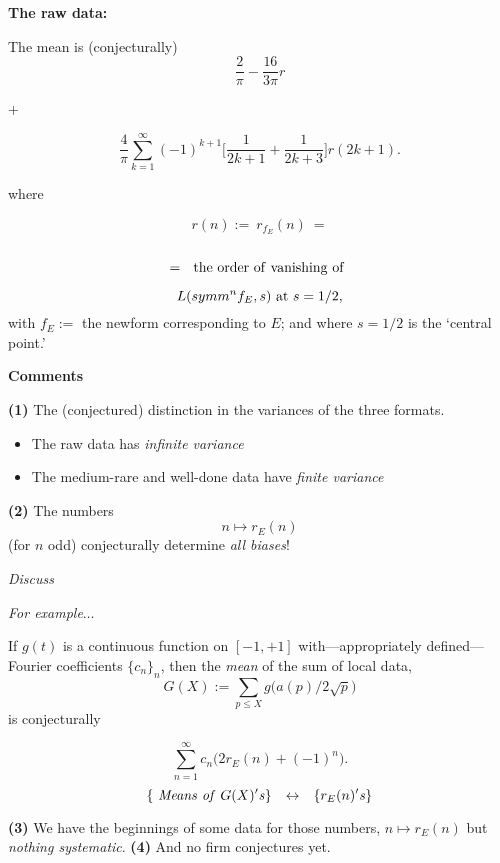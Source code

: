 \documentclass[12pt]{beamer}
\theoremstyle{definition}
\begin{document}
 \begin{frame}\vskip20pt
{\Large  \vskip20pt 
    
      \centerline{\bf The raw data:}\vskip5pt  The  mean is  (conjecturally) $$
{\frac{2}{\pi}}- {\frac{16}{3\pi}}r$$ \vskip5pt \centerline{ + }  \vskip5pt $$ {\frac{4}{\pi}} \sum_{k=1}^{\infty}  (-1)^{k+1}\big[{\frac{1}{2k+1}} + {\frac{1}{2k+3}}\big]r({2k+1}).
$$ \centerline{  where }  } \end{frame}
  
 \begin{frame}\vskip20pt
{\Large  \vskip20pt $$r(n):= \ r_{f_E}(n)\ =$$ \\
$$=\ \  {\rm the\ order\ of\ vanishing\ of\ }$$

$$L(symm^nf_E, s)\ {\rm at}\ s=1/2,$$ \vskip20pt with $f_E:=$ the newform  corresponding to  $E$; and where  $s=1/2$ is the `central point.'  } 
\end{frame}
  
 \begin{frame}
{\Large  \vskip20pt  \centerline{ \bf Comments}
\vskip20pt {\bf(1)}  The (conjectured) distinction in the variances of the three formats.\vskip20pt
  \begin{itemize} \item   The raw data has {\it infinite variance} \item The medium-rare and well-done data have {\it finite variance}\end{itemize}} \end{frame}
 \begin{frame}
{\Large  \vskip20pt   {\bf(2)} The numbers \vskip20pt $$n \mapsto r_E(n)$$ \vskip20pt (for $n$ odd) conjecturally determine {\it all biases}!} \vskip20pt \centerline{\it Discuss}\end{frame}
 \begin{frame}\vskip20pt  
{\Large  \vskip20pt  \centerline{\it For example$\dots$}  \vskip20pt   If    $g(t)$ is a continuous function on $[-1,+1]$  with---appropriately defined---Fourier coefficients $\{c_n\}_n$, then the {\it mean} of the sum of local data,  $$G(X):= \sum_{p\le X}g\big(a(p)/2{\sqrt p}\big)$$  is conjecturally}\end{frame}
 \begin{frame}\vskip20pt  
{\Large  \vskip20pt    $$\sum_{n=1}^{\infty}  c_n\big(2r_E(n)+(-1)^n\big).$$\vskip20pt  
$$\{ {\rm{\it  \  Means\ of\ }} G(X){\rm{\it 's}}\} \ \ \  {\leftrightarrow}\ \ \  \{r_E(n){\rm{\it 's}}\}$$}\end{frame}
 \begin{frame}\vskip20pt
{\Large  \vskip20pt
  {\bf(3)} We have the beginnings of some data for those numbers, $n \mapsto r_E(n)$
 \vskip20pt
 but {\it nothing systematic}.  \vskip20pt
  {\bf(4)} And no firm conjectures yet.}\end{frame}
  
\end{document}
